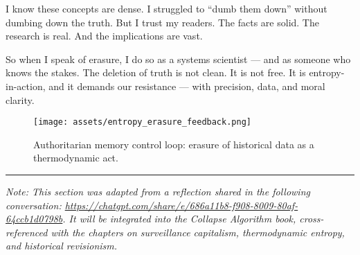 I know these concepts are dense. I struggled to ``dumb them down''
without dumbing down the truth. But I trust my readers. The facts are
solid. The research is real. And the implications are vast.

So when I speak of erasure, I do so as a systems scientist --- and as
someone who knows the stakes. The deletion of truth is not clean. It is
not free. It is entropy-in-action, and it demands our resistance ---
with precision, data, and moral clarity.

\begin{figure}[h]
\centering
\texttt{[image: assets/entropy\_erasure\_feedback.png]}
\caption{Authoritarian memory control loop: erasure of historical data as a thermodynamic act.}
\end{figure}

\begin{center}\rule{0.5\linewidth}{0.5pt}\end{center}

\emph{Note: This section was adapted from a reflection shared in the
following conversation:
\url{https://chatgpt.com/share/e/686a11b8-f908-8009-80af-64ccb1d0798b}.
It will be integrated into the Collapse Algorithm book, cross-referenced
with the chapters on surveillance capitalism, thermodynamic entropy, and
historical revisionism.}
